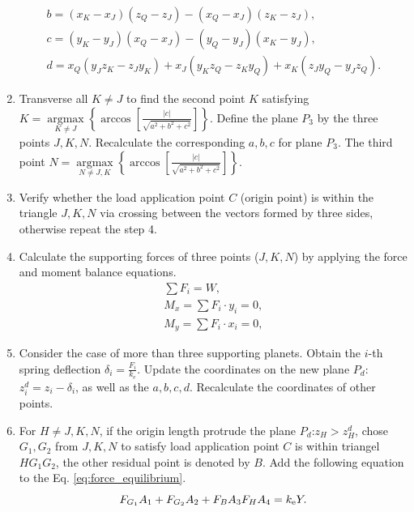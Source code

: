 \documentclass[a4paper,fleqn]{cas-sc}%
\begin{document}
\begin{enumerate}
\begin{equation}
\begin{split}
        b=\left(x_K-x_J\right) \left(z_Q-z_J\right)-\left(x_Q-x_J\right) \left(z_K-z_J\right),\\
        c=\left(y_K-y_J\right) \left(x_Q-x_J\right)-\left(y_Q-y_J\right) \left(x_K-y_J\right),\\
        d=x_Q \left(y_J z_K-z_J y_K\right)+x_J \left(y_K z_Q-z_K y_Q\right)+x_K \left(z_J y_Q-y_J z_Q\right).
        \end{split} 
    \end{equation}
    \item Transverse all $K\neq J$ to find the second point $K$ satisfying $K=\mathop{\arg\max}\limits_{K \neq J}\left\{\arccos\left[\frac{|c|}{\sqrt{a^2+b^2+c^2}}\right]\right\}$. Define the plane  $P_3$  by the three points $J, K, N$. Recalculate the corresponding $a, b,c$ for plane $P_3$. The third point $N=\mathop{\arg\max}\limits_{N \neq J,K}\left\{\arccos\left[\frac{|c|}{\sqrt{a^2+b^2+c^2}}\right]\right\}$.
    \item Verify whether the load  application point $C$ (origin point) is within the triangle $J,K,N$ via crossing between the vectors formed by three sides, otherwise repeat the step 4.
    \item Calculate the supporting forces of three points ($J,K,N$) by applying the force and moment balance equations.
    \begin{equation}
        \begin{split}
        \sum F_i=W,\\
        M_x=\sum F_i\cdot y_i=0,\\
        M_y=\sum F_i\cdot x_i=0, \label{eq:force_equilibrium}
        \end{split}
    \end{equation}
    \item Consider the case of more than three supporting planets. Obtain the $i$-th spring deflection $\delta_i=\frac{F_i}{k_e}$. Update the coordinates on the new plane $P_d$: $z^d_i=z_i-\delta_i$, as well as the $a,b,c,d$. Recalculate the coordinates of other points.
    \item For $H\neq J,K,N$, if the origin length protrude the plane $P_d$:$z_H>z^d_H$, chose $G_1,G_2$ from $J,K,N$ to satisfy load application point $C$ is within triangel $HG_1G_2$, the other residual point is denoted by $B$. Add the following equation to the Eq. \ref{eq:force_equilibrium}.
    \begin{equation}
        F_{G_1}A_1+F_{G_2}A_2+F_B A_3 F_H A_4=k_{\rm e}Y.
    \end{equation}

\end{enumerate}
\end{document}
